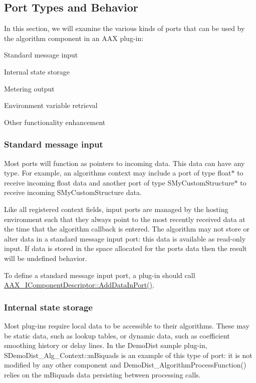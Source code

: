  \hypertarget{a00797_alg_porttypes}{}\subsection{Port Types and Behavior}\label{a00797_alg_porttypes}
In this section, we will examine the various kinds of ports that can be used by the algorithm component in an A\+AX plug-\/in\+: 
\begin{DoxyEnumerate}
\item Standard message input  
\item Internal state storage  
\item Metering output  
\item Environment variable retrieval  
\item Other functionality enhancement  
\end{DoxyEnumerate}

\hypertarget{a00797_subsection__standard_message_input}{}\subsubsection{Standard message input}\label{a00797_subsection__standard_message_input}
Most ports will function as pointers to incoming data. This data can have any type. For example, an algorithm\textquotesingle{}s context may include a port of type float$\ast$ to receive incoming float data and another port of type {\ttfamily S\+My\+Custom\+Structure}$\ast$ to receive incoming {\ttfamily S\+My\+Custom\+Structure} data.

Like all registered context fields, input ports are managed by the hosting environment such that they always point to the most recently received data at the time that the algorithm callback is entered. The algorithm may not store or alter data in a standard message input port\+: this data is available as read-\/only input. If data is stored in the space allocated for the port\textquotesingle{}s data then the result will be undefined behavior.

To define a standard message input port, a plug-\/in should call \mbox{\hyperlink{a01781_a230293b9f6bb413626cd487ca501df75}{A\+A\+X\+\_\+\+I\+Component\+Descriptor\+::\+Add\+Data\+In\+Port()}}.

\hypertarget{a00797_subsection__internal_state_storage}{}\subsubsection{Internal state storage}\label{a00797_subsection__internal_state_storage}
Most plug-\/ins require local data to be accessible to their algorithms. These may be static data, such as lookup tables, or dynamic data, such as coefficient smoothing history or delay lines. In the Demo\+Dist sample plug-\/in, {\ttfamily S\+Demo\+Dist\+\_\+\+Alg\+\_\+\+Context\+::m\+Biquads} is an example of this type of port\+: it is not modified by any other component and {\ttfamily Demo\+Dist\+\_\+\+Algorithm\+Process\+Function()} relies on the {\ttfamily m\+Biquads} data persisting between processing calls.

